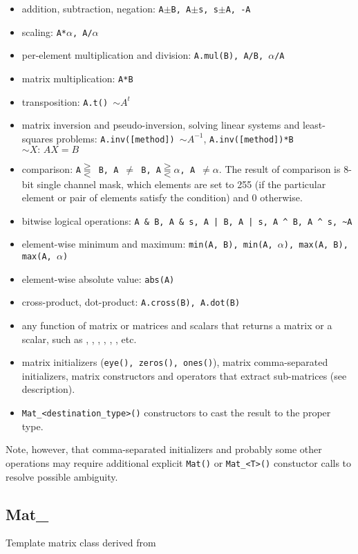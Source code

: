 \begin{itemize}
    \item addition, subtraction, negation: \texttt{A$\pm$B, A$\pm$s, s$\pm$A, -A}
    \item scaling: \texttt{A*$\alpha$, A/$\alpha$}
    \item per-element multiplication and division: \texttt{A.mul(B), A/B, $\alpha$/A}
    \item matrix multiplication: \texttt{A*B}
    \item transposition: \texttt{A.t() $\sim A^t$}
    \item matrix inversion and pseudo-inversion, solving linear systems and least-squares problems:
        \texttt{A.inv([method]) $\sim A^{-1}$}, \texttt{A.inv([method])*B $\sim X:\,AX=B$}
    \item comparison: \texttt{A$\gtreqqless$ B, A $\ne$ B, A$\gtreqqless \alpha$, A $\ne \alpha$}.
          The result of comparison is 8-bit single channel mask, which elements are set to 255
          (if the particular element or pair of elements satisfy the condition) and 0 otherwise.
    \item bitwise logical operations: \verb"A & B, A & s, A | B, A | s, A ^ B, A ^ s, ~A"
    \item element-wise minimum and maximum: \texttt{min(A, B), min(A, $\alpha$), max(A, B), max(A, $\alpha$)}
    \item element-wise absolute value: \texttt{abs(A)}
    \item cross-product, dot-product: \texttt{A.cross(B), A.dot(B)}
    \item any function of matrix or matrices and scalars that returns a matrix or a scalar, such as
          , , , , ,
          ,  etc.
    \item matrix initializers (\texttt{eye(), zeros(), ones()}), matrix comma-separated initializers,
          matrix constructors and operators that extract sub-matrices (see  description).
    \item \verb"Mat_<destination_type>()" constructors to cast the result to the proper type.
\end{itemize}
Note, however, that comma-separated initializers and probably some other operations may require additional explicit \texttt{Mat()} or \verb"Mat_<T>()" constuctor calls to resolve possible ambiguity.

\subsection{Mat\_}\label{MatT}
Template matrix class derived from 

